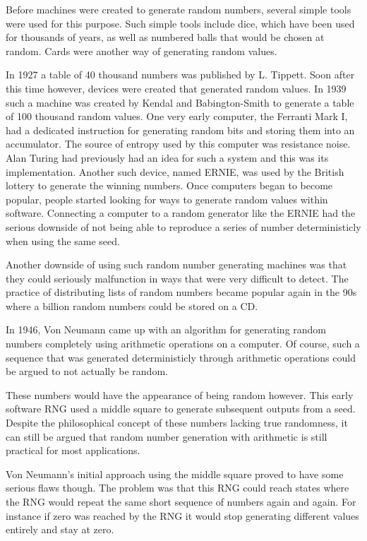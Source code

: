 \documentclass{article}
\begin{document}
    Before machines were created to generate random numbers, several simple tools
    were used for this purpose.
    Such simple tools include dice, which have been used for thousands of years,
    as well as numbered balls that would be chosen at random.
    Cards were another way of generating random values.

    In 1927 a table of 40 thousand numbers was published by L. Tippett.
    Soon after this time however, devices were created that generated random
    values. In 1939 such a machine was created by Kendal and Babington-Smith
    to generate a table of 100 thousand random values.
    One very early computer, the Ferranti Mark I, had a dedicated instruction
    for generating random bits and storing them into an accumulator.
    The source of entropy used by this computer was resistance noise.
    Alan Turing had previously had an idea for such a system and this was
    its implementation.
    Another such device, named ERNIE, was used by the British lottery to
    generate the winning numbers.
    Once computers began to become popular, people started looking for ways
    to generate random values within software. Connecting a computer
    to a random generator like the ERNIE had the serious downside
    of not being able to reproduce a series of number deterministicly
    when using the same seed.

    Another downside of using such random number generating machines
    was that they could seriously malfunction in ways that were very difficult to
    detect.
    The practice of distributing lists of random numbers became popular again
    in the 90s where a billion random numbers could be stored on a CD.

    In 1946, Von Neumann came up with an algorithm for generating random
    numbers completely using arithmetic operations on a computer.
    Of course, such a sequence that was generated deterministicly through
    arithmetic operations could be argued to not actually be random.

    These numbers would have the appearance of being random however.
    This early software RNG used a middle square to generate subsequent
    outputs from a seed.
    Despite the philosophical concept of these numbers lacking true randomness,
    it can still be argued that random number generation with
    arithmetic is still practical for most applications.

    Von Neumann's initial approach using the middle square proved to have
    some serious flaws though. The problem was that this RNG could
    reach states where the RNG would repeat the same short sequence of
    numbers again and again. For instance if zero was reached by the RNG
    it would stop generating different values entirely and stay at zero.
\end{document}
